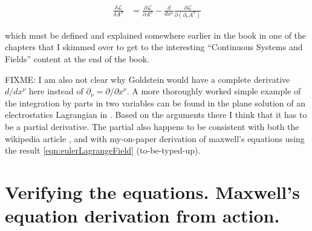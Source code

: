 \documentclass{article}
\newcommand{\LL}[0]{\mathcal{L}}
\newcommand{\PD}[2]{\frac{\partial {#2}}{\partial {#1}}}
\begin{document}
\begin{align*}
\frac{\delta \LL}{\delta A^\sigma} &= \PD{A^\sigma}{\LL} - \frac{d}{dx^\nu} \PD{(\partial_\nu A^\sigma)}{\LL}
\end{align*}

which must be defined and explained somewhere earlier in the book in one of the chapters that I skimmed over to get to the interesting ``Continuous Systems and Fields'' content
at the end of the book.

FIXME: I am also not clear why Goldstein would have a complete derivative $d/dx^\nu$ here instead of $\partial_\nu = \partial/{\partial x^\nu}$.  A more thoroughly worked simple example
of the integration by parts in two variables can be found in the plane solution of an electrostatics Lagrangian in \cite{PJMaxwellLagrangian}.  Based on the arguments there I think that it has to be a partial derivative.   The partial also happens to be consistent with both the wikipedia article \cite{wikiemtensor}, and with my-on-paper derivation of maxwell's equations using the result \ref{eqn:eulerLagrangeField} (to-be-typed-up).

\section{ Verifying the equations.  Maxwell's equation derivation from action. }

\end{document}
